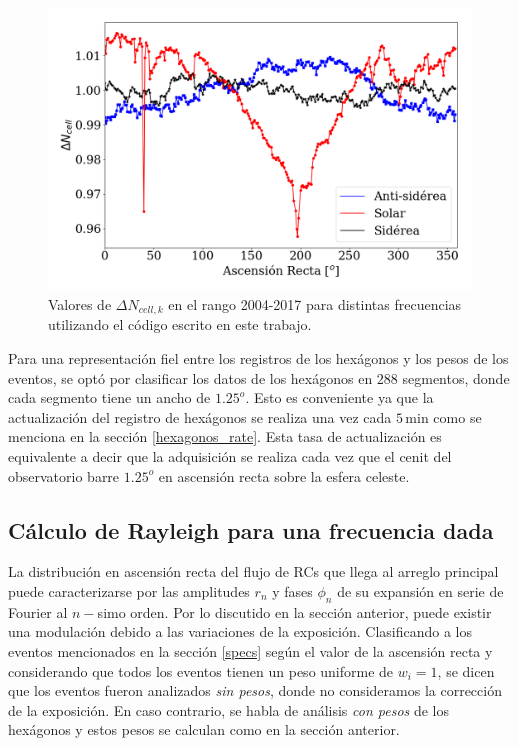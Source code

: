        \begin{figure}[H]
          \centering
              \includegraphics[width=0.75\linewidth]{weigths_2020.png}
              \caption{Valores de $\Delta N_{cell, k}$ en el rango 2004-2017 para distintas frecuencias utilizando el código escrito en este trabajo.}
              \label{fig:pesos_ejemplo}
        \end{figure}

    Para una representación fiel entre los registros de los hexágonos y los pesos de los eventos, se optó por clasificar los datos de los hexágonos en $288$ segmentos, donde cada segmento tiene un ancho de $1.25^o$. Esto es conveniente ya que la actualización del registro de hexágonos se realiza una vez  cada $5\,$min como se menciona en la sección \ref{hexagonos_rate}. Esta tasa de actualización es equivalente a decir que la adquisición se realiza cada vez que el cenit del observatorio barre  $1.25^o$ en ascensión recta sobre la esfera celeste.



  \subsection{Cálculo de Rayleigh para una frecuencia dada} \label{rayleigh}

  La distribución en ascensión recta del flujo de RCs que llega al arreglo principal puede caracterizarse por las amplitudes $r_n$ y fases $\phi_n$ de su expansión en serie de Fourier al $n-$simo orden. Por lo discutido en la sección anterior, puede existir una modulación debido a las variaciones de la exposición.  Clasificando a los eventos mencionados en la sección \ref{specs} según el valor de la ascensión recta y considerando que todos los eventos tienen un peso uniforme de $w_i=1$, se dicen que los eventos fueron analizados \textit{sin pesos}, donde no consideramos la corrección de la exposición. En caso contrario, se habla de análisis \textit{con pesos} de los hexágonos  y estos pesos se calculan como en la sección anterior.

